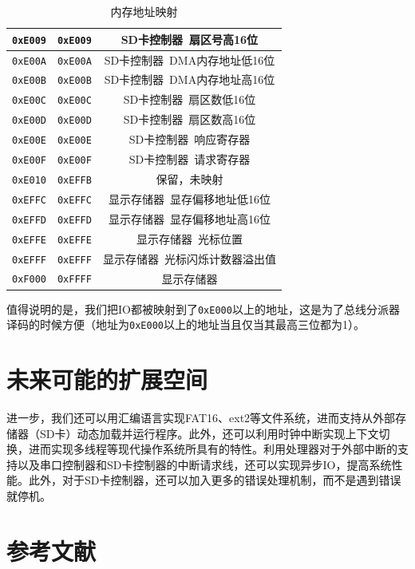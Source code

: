 \documentclass[11pt,utf8]{report}
\begin{document}
\begin{table}[H]
\begin{tabular}{c|c|c}
\texttt{0xE009} & \texttt{0xE009} & SD卡控制器~扇区号高16位 \\ \hline
\texttt{0xE00A} & \texttt{0xE00A} & SD卡控制器~DMA内存地址低16位 \\ \hline
\texttt{0xE00B} & \texttt{0xE00B} & SD卡控制器~DMA内存地址高16位 \\ \hline
\texttt{0xE00C} & \texttt{0xE00C} & SD卡控制器~扇区数低16位 \\ \hline
\texttt{0xE00D} & \texttt{0xE00D} & SD卡控制器~扇区数高16位 \\ \hline
\texttt{0xE00E} & \texttt{0xE00E} & SD卡控制器~响应寄存器 \\ \hline
\texttt{0xE00F} & \texttt{0xE00F} & SD卡控制器~请求寄存器 \\ \hline
\texttt{0xE010} & \texttt{0xEFFB} & 保留，未映射 \\ \hline
\texttt{0xEFFC} & \texttt{0xEFFC} & 显示存储器~显存偏移地址低16位 \\ \hline
\texttt{0xEFFD} & \texttt{0xEFFD} & 显示存储器~显存偏移地址高16位 \\ \hline
\texttt{0xEFFE} & \texttt{0xEFFE} & 显示存储器~光标位置 \\ \hline
\texttt{0xEFFF} & \texttt{0xEFFF} & 显示存储器~光标闪烁计数器溢出值 \\ \hline
\texttt{0xF000} & \texttt{0xFFFF} & 显示存储器 \\
\bottomrule[1.2pt]
\end{tabular}
\caption{内存地址映射}
\label{mmap}
\end{table}

	\par 值得说明的是，我们把IO都被映射到了\texttt{0xE000}以上的地址，这是为了总线分派器译码的时候方便（地址为\texttt{0xE000}以上的地址当且仅当其最高三位都为1）。

\chapter{未来可能的扩展空间}
	\par 进一步，我们还可以用汇编语言实现FAT16、ext2等文件系统，进而支持从外部存储器（SD卡）动态加载并运行程序。此外，还可以利用时钟中断实现上下文切换，进而实现多线程等现代操作系统所具有的特性。利用处理器对于外部中断的支持以及串口控制器和SD卡控制器的中断请求线，还可以实现异步IO，提高系统性能。此外，对于SD卡控制器，还可以加入更多的错误处理机制，而不是遇到错误就停机。

\chapter{参考文献}
\end{document}
